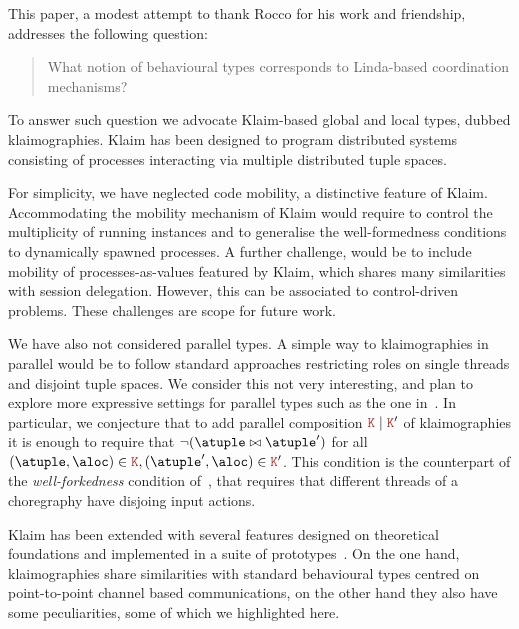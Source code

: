 

This paper, a modest attempt to thank Rocco for his work and
friendship, addresses the following question:
%
\begin{quote}
  What notion of behavioural types corresponds to Linda-based
  coordination mechanisms?
\end{quote}
%
To answer such question we advocate Klaim-based global and local
types, dubbed klaimographies.
%
Klaim has been designed to program distributed systems consisting of
processes interacting via multiple distributed tuple spaces.

For simplicity, we have neglected code mobility, a distinctive feature
of Klaim.
%
Accommodating the mobility mechanism of Klaim would require to control
the multiplicity of running instances and to generalise the
well-formedness conditions to dynamically spawned processes.
%
A further challenge, would be to include mobility of
processes-as-values featured by Klaim, which shares many
similarities with session delegation.
%
However, this can be associated to control-driven problems.
%
These challenges are scope for future work.

We have also not considered parallel types.
%
A simple way to klaimographies in parallel would be to follow standard
approaches restricting roles on single threads and disjoint tuple
spaces.
%
We consider this not very interesting, and plan to explore more expressive
settings for parallel types such as the one in~\cite{gt16,gt17}.
%
In particular, we conjecture that to add parallel composition
$\aK \mid \aK'$ of klaimographies it is enough to require that
$\neg(\atuple \matches \atuple')$ for all
$(\atuple, \aloc) \in \aK, (\atuple', \aloc) \in \aK'$.
%
This condition is the counterpart of the \emph{well-forkedness}
condition of~\cite{gt16,gt17}, that requires that different threads of
a choregraphy have disjoing input actions.

Klaim has been extended with several features designed on theoretical
foundations and implemented in a suite of
prototypes~\cite{klaim}.
%
On the one hand, klaimographies share similarities with standard
behavioural types centred on point-to-point channel based
communications, on the other hand they also have some peculiarities,
some of which we highlighted here.

